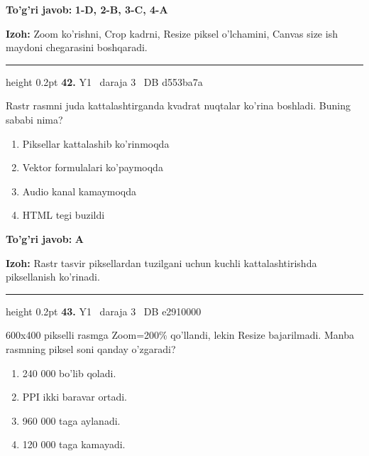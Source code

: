\documentclass[10pt,a4paper,oneside]{article}
\begin{document}
\begin{tcolorbox}[enhanced,breakable,colback=teal!4,colframe=teal!45!black,boxrule=0.45pt,arc=1.2mm,left=2.8mm,right=2.8mm,top=2mm,bottom=2mm,before skip=2mm,after skip=2mm]
\textbf{\color{teal}To'g'ri javob:} \textbf{1-D, 2-B, 3-C, 4-A}
\par\smallskip
\textbf{Izoh:} Zoom ko'rishni, Crop kadrni, Resize piksel o'lchamini, Canvas size ish maydoni chegarasini boshqaradi.
\end{tcolorbox}
\vspace{2mm}\hrule height 0.2pt \vspace{4mm}
\hypertarget{q42}{\textbf{\color{ink}42.}}  {\color{muted}\scriptsize Y1 \textbullet\ daraja 3 \textbullet\ DB d553ba7a}
\par
Rastr rasmni juda kattalashtirganda kvadrat nuqtalar ko'rina boshladi. Buning sababi nima?
\begin{enumerate}[label=\Alph*),leftmargin=9mm]
\item Piksellar kattalashib ko'rinmoqda
\item Vektor formulalari ko'paymoqda
\item Audio kanal kamaymoqda
\item HTML tegi buzildi
\end{enumerate}
\begin{tcolorbox}[enhanced,breakable,colback=teal!4,colframe=teal!45!black,boxrule=0.45pt,arc=1.2mm,left=2.8mm,right=2.8mm,top=2mm,bottom=2mm,before skip=2mm,after skip=2mm]
\textbf{\color{teal}To'g'ri javob:} \textbf{A}
\par\smallskip
\textbf{Izoh:} Rastr tasvir piksellardan tuzilgani uchun kuchli kattalashtirishda piksellanish ko'rinadi.
\end{tcolorbox}
\vspace{2mm}\hrule height 0.2pt \vspace{4mm}
\hypertarget{q43}{\textbf{\color{ink}43.}}  {\color{muted}\scriptsize Y1 \textbullet\ daraja 3 \textbullet\ DB e2910000}
\par
600x400 pikselli rasmga Zoom=200\% qo'llandi, lekin Resize bajarilmadi. Manba rasmning piksel soni qanday o'zgaradi?
\begin{enumerate}[label=\Alph*),leftmargin=9mm]
\item 240 000 bo'lib qoladi.
\item PPI ikki baravar ortadi.
\item 960 000 taga aylanadi.
\item 120 000 taga kamayadi.
\end{enumerate}
\end{document}
